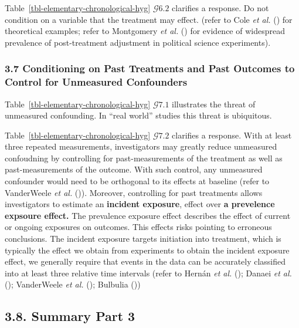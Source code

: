 \documentclass[
  single column]{article}
\begin{document}
Table~\ref{tbl-elementary-chronological-hyg} \(\mathcal{G} 6.2\)
clarifies a response. Do not condition on a variable that the treatment
may effect. (refer to Cole \emph{et al.} ()
for theoretical examples; refer to Montgomery \emph{et al.}
() for evidence of widespread
prevalence of post-treatment adjustment in political science
experiments).

\subsubsection{3.7 Conditioning on Past Treatments and Past Outcomes to
Control for Unmeasured
Confounders}\label{conditioning-on-past-treatments-and-past-outcomes-to-control-for-unmeasured-confounders}

Table~\ref{tbl-elementary-chronological-hyg} \(\mathcal{G} 7.1\)
illustrates the threat of unmeasured confounding. In ``real world''
studies this threat is ubiquitous.

Table~\ref{tbl-elementary-chronological-hyg} \(\mathcal{G} 7.2\)
clarifies a response. With at least three repeated measurements,
investigators may greatly reduce unmeasured confoudning by controlling
for past-measurements of the treatment as well as past-measurements of
the outcome. With such control, any unmeasured confounder would need to
be orthogonal to its effects at baseline (refer to VanderWeele \emph{et
al.} ()). Moreover, controlling for
past treatments allows investigators to estimate an \textbf{incident
exposure}, effect over \textbf{a prevelence expsoure effect.} The
prevalence exposure effect describes the effect of current or ongoing
exposures on outcomes. This effects risks pointing to erroneous
conclusions. The incident exposure targets initiation into treatment,
which is typically the effect we obtain from experiments to obtain the
incident exposure effect, we generally require that events in the data
can be accurately classified into at least three relative time intervals
(refer to Hernán \emph{et al.} ();
Danaei \emph{et al.} (); VanderWeele
\emph{et al.} (); Bulbulia
())

\subsection{3.8. Summary Part 3}\label{summary-part-3}
\end{document}
